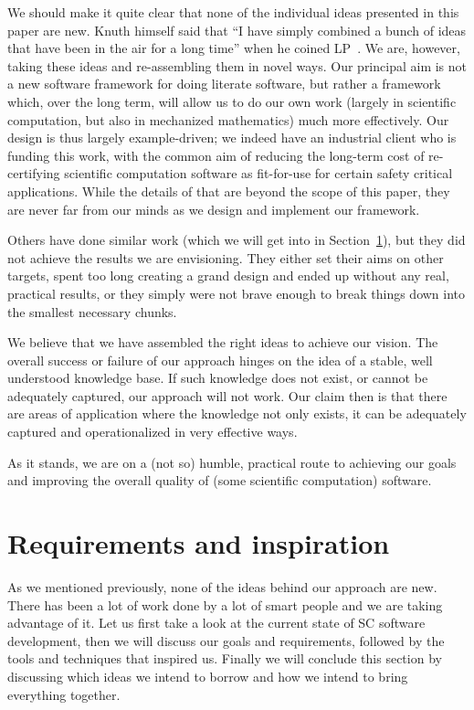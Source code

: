 \documentclass[preprint, 10pt]{sigplanconf}
\begin{document}
We should make it quite clear that none of the individual ideas presented
in this paper are new.  Knuth himself
said that ``I have simply combined a bunch of ideas that have been in the air
for a long time'' when he coined LP~\cite{Knuth1984}. We are, however, taking these
ideas and re-assembling them in novel ways.  Our principal aim is not a new
software framework for doing literate software, but rather a framework which,
over the long term, will allow us to do our own work (largely in scientific
computation, but also in mechanized mathematics) much more effectively.  Our design
is thus largely example-driven; we indeed have an industrial client who is funding
this work, with the common aim of reducing the long-term cost of re-certifying
scientific computation software as fit-for-use for certain safety critical 
applications.  While the details of that are beyond the scope of this paper, they 
are never far from our minds as we design and implement our framework.

Others have done similar work (which we will get into in Section~\ref{sec:bg}),
but they did not achieve the results we are envisioning. They either set their
aims on other targets, spent too long creating a grand design and ended up
without any real, practical results, or they simply were not brave enough to
break things down into the smallest necessary chunks.

We believe that we have assembled the right ideas to achieve our vision.
The overall success or failure of our approach hinges on the idea of a stable,
well understood knowledge base. If such knowledge does not exist, or cannot be
adequately captured, our approach will not work.  Our claim then is that there 
are areas of application where the knowledge not only exists, it can be adequately
captured and operationalized in very effective ways.

As it stands, we are on a (not so) humble, practical route to achieving our
goals and improving the overall quality of (some scientific computation) software.

\section{Requirements and inspiration}
\label{sec:bg}

As we mentioned previously, none of the ideas behind our approach are new. There
has been a lot of work done by a lot of smart people and we are taking advantage
of it. Let us first take a look at the current
state of SC software development, then we will discuss our goals and
requirements, followed by the tools and techniques that inspired us. Finally we
will conclude this section by discussing which ideas we intend to borrow and
how we intend to bring everything together.
\end{document}
